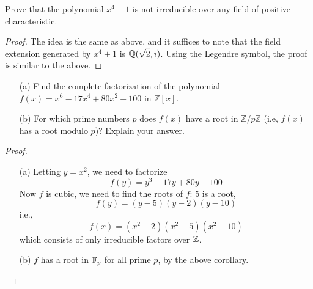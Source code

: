 \begin{prob}[S2015-Q4]
    Prove that the polynomial \(x^{4}+1\) is not irreducible over any field of positive characteristic.
\end{prob}
\begin{proof}
    The idea is the same as above, and it suffices to note that the field extension generated by $x^4+1$ is $\mathbb{Q}(\sqrt{2}, i)$. Using the Legendre symbol, the proof is similar to the above.
\end{proof}



\begin{prob}[F2010-Q2]
    \phantom{text}
    \begin{itemize}
        \item[(a)] Find the complete factorization of the polynomial \(f(x) = x^6 - 17x^4 + 80x^2 - 100\) in \(\mathbb{Z}[x]\).
        \item[(b)] For which prime numbers \(p\) does \(f(x)\) have a root in \(\mathbb{Z}/p\mathbb{Z}\) (i.e, \(f(x)\) has a root modulo \(p\))? Explain your answer.
    \end{itemize}
\end{prob}
\begin{proof}
    \begin{itemize}
        \item[(a)] Letting $y=x^2$, we need to factorize 
        \begin{equation*}
            f(y)=y^3-17y+80y-100
        \end{equation*}
        Now $f$ is cubic, we need to find the roots of $f$: $5$ is a root, 
        \begin{equation*}
            f(y)=(y-5)(y-2)(y-10)
        \end{equation*}
        i.e., 
        \begin{equation*}
            f(x)=(x^2-2)(x^2-5)(x^2-10)
        \end{equation*}
        which consists of only irreducible factors over $\mathbb{Z}$.
        \item[(b)] $f$ has a root in $\mathbb{F}_p$ for all prime $p$, by the above corollary.
    \end{itemize}
\end{proof}



